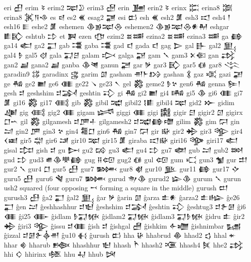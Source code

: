  eri  𒌷   
 erim  𒂟   
 erim2  𒉈𒊒    
 erim3  𒌿   
 erin  𒂞   
 erin2  𒂟   
 erinx  𒈶   
 erina8  𒈷   
 erina8  𒈸𒀀𒈾    
 es  𒁀   
 es2  𒌍   
 esag2  𒃥   
 esi  𒆗   
 esh  𒌍   
 esh2  𒂠   
 esh3  𒀊   
 esh4  𒁹   
 esh16  𒀼   
 eshe2  𒂠   
 eshemen  𒆠𒂊𒉈𒁲    
 eshemen2  𒆠𒂊𒉈𒁲𒀭𒈹    
 eshgar  𒀾𒃼    
 eshtub  𒄞   
 et  𒀉   
 ezen  𒂡   
 ezim2  𒊺𒌁    
 ezina2  𒊺𒌁    
 ezina3  𒌁   
 ga  𒂵   
 ga14  𒅗   
 ga2  𒂷   
 gab  𒃮   
 gaba  𒃮   
 gad  𒃰   
 gada  𒃰   
 gag  𒆕   
 gal  𒃲   
 gal2  𒅅   
 gal4  𒊩   
 gal5  𒋼   
 gala  𒍑𒆪    
 galam  𒃴   
 galga  𒃌   
 gam  𒃵   
 gam3  𒉽𒈿    
 gan  𒃶   
 gan2  𒃷   
 gana2  𒃷   
 ganba  𒆠𒇴    
 ganun  𒃠   
 gar  𒃻   
 gar3  𒃼   
 gar5  𒈖   
 gar8  𒋞   
 garadin9  𒌏   
 garadinx  𒃱   
 garim  𒇑   
 gasham  𒉣𒈨𒋳    
 gashan  𒃽   
 gaz  𒄤   
 gazi  𒃢   
 ge  𒄀   
 ge2  𒆤   
 ge6  𒈪   
 ge22  𒀺   
 ge23  𒀹   
 gel  𒄃   
 geme2  𒊩𒆳    
 gen6  𒄀   
 genna  𒌉𒁹    
 gesh  𒄑   
 geshshim  𒄑𒋆    
 geshtin  𒃾   
 gi  𒄀   
 gi2  𒆤   
 gi4  𒄄   
 gi5  𒆠   
 gi6  𒈪   
 gi7  𒂠   
 gi16  𒄃   
 gi17  𒍼   
 gib  𒄃   
 gibil  𒉋   
 gibil2  𒋙𒀾    
 gibil4  𒉈   
 gid2  𒁍   
 gidim  𒄇   
 gig  𒍼   
 gig2  𒈪   
 gigam  𒈓   
 giggi  𒈪   
 gigi  𒄅   
 gigir  𒇀   
 gigir2  𒇥   
 gigirx  𒆸𒌀      
 gil  𒄃   
 gilgamesh  𒄑𒂆𒈦    
 gilgamesh2  𒄑𒉋𒂵𒈩    
 gilim  𒄃   
 gim  𒁶   
 gin  𒁺   
 gin2  𒂆   
 gin3  𒆳   
 gin4  𒍤𒆸    
 gin6  𒄀   
 gin7  𒁶   
 gir  𒄫   
 gir2  𒄈   
 gir3  𒄊   
 gir4  𒌋𒀜    
 gir5  𒁽   
 gir6  𒁼   
 gir10  𒉈   
 gir15  𒂠   
 giraba  𒀊𒄫    
 giri16  𒄌   
 giri17  𒅗   
 gisal  𒄐   
 gish  𒄑   
 gu  𒄖   
 gu2  𒄘   
 gu3  𒅗   
 gu4  𒄞   
 gu7  𒅥   
 gub  𒁺   
 gub2  𒇷   
 gud  𒄞   
 gud3  𒌑𒆠𒋧𒂵    
 gug  𒍝𒄢    
 gug2  𒈖   
 gul  𒄢   
 gum  𒄣   
 gun3  𒁯   
 gur  𒄥   
 gur2  𒃵   
 gur4  𒆸   
 gur5  𒍀   
 gur7  𒄦   
 gur8  𒋽   
 gur10  𒆥   
 gur11  𒂵   
 gur17  𒄕   
 guru5  𒍀   
 guru6  𒃸   
 guru7  𒄦   
 gurud  𒉩𒆠    
 gurud2  𒇽𒆠    
 gurum  𒃵   
 gurun  ush2 squared (four opposing 𒍗 forming a square in the  
   middle)   
 gurush  𒄨   
 gurush3  𒍀   
 ĝa2  𒂷   
 ĝal2  𒅅   
 ĝar  𒃻   
 ĝarin  𒇑   
 ĝarza  𒉺𒀭    
 ĝarza2  𒉺𒈗    
 ĝe26  𒂷   
 ĝen  𒁺   
 ĝeshhashhur  𒄑𒈢    
 ĝeshshim  𒄑𒋆    
 ĝeshtin  𒃾   
 ĝeshtug3  𒄑𒉿𒌆    
 ĝi6  𒈪   
 ĝi25  𒂂   
 ĝidlam  𒊩𒍑𒁮    
 ĝidlam2  𒍑𒁮    
 ĝidlam3  𒍑𒊩𒁮    
 ĝidru  𒉺   
 ĝir2  𒄈   
 ĝiri3  𒄊   
 ĝissu  𒄑𒈪    
 ĝish  𒄑   
 ĝishgal  𒍇   
 ĝishkim  𒅆𒁾    
 ĝishnimbar  𒊷   
 ĝizzal  𒄑𒌆𒉿𒎓𒉣    
 ĝu10  𒈬   
 ĝurush  𒆗   
 hha  𒄩   
 hhabrud  𒆢   
 hhad2  𒌓   
 hhal  𒄬   
 hhar  𒄯   
 hharub  𒁬   
 hhashhur  𒈢   
 hhash  𒋻   
 hhash2  𒍨   
 hhash4  𒍮   
 hhe2  𒃶   
 hhi  𒄭   
 hhirinx  𒆶   
 hhu  𒄷   
 hhub  𒄽   
